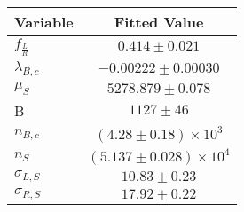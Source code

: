 \begin{tabular}[t]{lc}
\hline
Variable &Fitted Value\\
\hline\hline
$f_{\frac{L}{R}}$&$0.414\pm0.021$\\
\hline
$\lambda_{B,c}$&$-0.00222\pm0.00030$\\
\hline
$\mu_S$&$5278.879\pm0.078$\\
\hline
B&$1127\pm46$\\
\hline
$n_{B,c}$&$(4.28\pm0.18)\times 10^3$\\
\hline
$n_S$&$(5.137\pm0.028)\times 10^4$\\
\hline
$\sigma_{L, S}$&$10.83\pm0.23$\\
\hline
$\sigma_{R, S}$&$17.92\pm0.22$\\
\hline
\end{tabular}